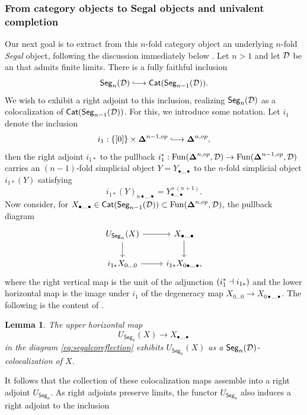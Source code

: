 \documentclass[10pt, reqno, twoside
, final
]{amsart}
\numberwithin{equation}{subsection}%
\theoremstyle{definition}
\theoremstyle{definition}
\theoremstyle{definition}
\theoremstyle{definition}
\theoremstyle{definition}
\theoremstyle{definition}
\theoremstyle{definition}
\theoremstyle{definition}
\theoremstyle{definition}
\theoremstyle{plain}
\theoremstyle{definition}
\theoremstyle{plain}
\theoremstyle{definition}
\theoremstyle{plain}
\theoremstyle{definition}
\theoremstyle{definition}
\theoremstyle{plain}
\newtheorem{lem}[defn]{Lemma}
\theoremstyle{plain}
\theoremstyle{definition}
\theoremstyle{plain}
\theoremstyle{plain}
\theoremstyle{plain}
\begin{document}
\subsubsection{From category objects to Segal objects and univalent completion}
Our next goal is to extract from this $n$-fold category object an underlying $n$-fold \emph{Segal} object, following the discussion immediately below \cite[Definition 4.11]{Haugseng-iteratedspans}. Let $n>1$ and let $\mathcal{D}$ be an \infcat that admits finite limits. There is a fully faithful inclusion
\[  \mathsf{Seg}_n(\icatd)\hooklongrightarrow \mathsf{Cat}(\mathsf{Seg}_{n-1}(\icatd)).  \]
We wish to exhibit a right adjoint to this inclusion, realizing $\mathsf{Seg}_n(\mathcal{D})$ as a colocalization of $\mathsf{Cat}(\mathsf{Seg}_{n-1}(\mathcal{D}))$. For this, we introduce some notation. Let $i_1$ denote the inclusion 
\[ i_1: \{[0]\}\times \simp^{n-1,op} \hooklongrightarrow \simp^{n,op},   \]
then the right adjoint $i_{1*}$ to the pullback $i_1^*:\mathrm{Fun}(\boldsymbol{\Delta}^{n,op},\mathcal{D})\rightarrow \mathrm{Fun}(\boldsymbol{\Delta}^{n-1,op},\mathcal{D})$ carries an $(n-1)$-fold simplicial object $Y=Y_{\bullet\ldots\bullet}$ to the $n$-fold simplicial object $i_{1*}(Y)$ satisfying 
\[  i_{1*}(Y)_{n\bullet\ldots\bullet} = Y_{\bullet\ldots\bullet}^{\times (n+1)}. \]
Now consider, for $X_{\bullet\ldots\bullet}\in \mathsf{Cat}(\mathsf{Seg}_{n-1}(\mathcal{D}))\subset \mathrm{Fun}(\boldsymbol{\Delta}^{n,op},\mathcal{D})$, the pullback diagram
\begin{equation}\label{eq:segalcoreflection}
\begin{tikzcd}
  U_{\mathsf{Seg}_n}(X) \ar[r] \ar[d] & X_{\bullet\ldots\bullet}\ar[d] \\
  i_{1*}X_{0\ldots0} \ar[r] & i_{1*}X_{0\bullet\ldots\bullet},
\end{tikzcd}
\end{equation}
where the right vertical map is the unit of the adjunction $(i_1^*\dashv i_{1*})$ and the lower horizontal map is the image under $i_1$ of the degeneracy map $X_{0\ldots0}\rightarrow X_{0\bullet\ldots\bullet}$. The following is the content of \cite[Lemma 4.17]{Haugseng-iteratedspans}.
\begin{lem}
The upper horizontal map 
\[ U_{\mathsf{Seg}_n}(X) \longrightarrow X_{\bullet\ldots\bullet} \]
in the diagram \ref{eq:segalcoreflection} exhibits $U_{\mathsf{Seg}_n}(X)$ as a $\mathsf{Seg}_n(\mathcal{D})$-colocalization of $X$. 
\end{lem}
It follows that the collection of these colocalization maps assemble into a right adjoint $U_{\mathsf{Seg}_n}$. As right adjoints preserve limits, the functor $U_{\mathsf{Seg}_n}$ also induces a right adjoint to the inclusion
\end{document}
